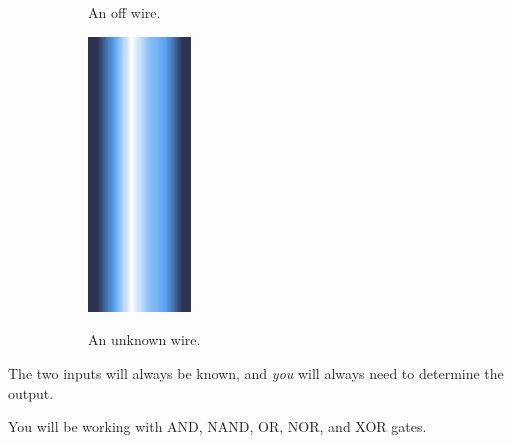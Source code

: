 \documentclass[12pt]{book}
\begin{document}
\begin{figure}[h]
\begin{subfigure}[t]{0.3\textwidth}
					An off wire.
				\end{subfigure}
				\hspace{1mm}
				\begin{subfigure}[t]{0.3\textwidth}
					\centering
					\includegraphics[width=0.3\textwidth]{UNKNOWN}

					An unknown wire.
				\end{subfigure}
			\end{figure}

			The two inputs will always be known, and \emph{you} will always need to determine the output.

			You will be working with AND, NAND, OR, NOR, and XOR gates.
\end{document}
